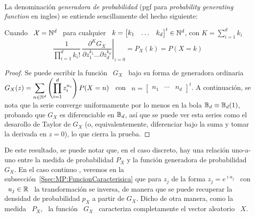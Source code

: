 \

La denominaci\'on  {\em generadora de  probabilidad} (pgf para  {\em probability
  generating function} en ingles) se entiende sencillamente del hecho siguiente:
%
\begin{lema}
  Cuando \ $\mathcal{X} = \mathbb{N}^d$ \ para cualquier \ $k = \begin{bmatrix} k_1 & \ldots &
    k_d \end{bmatrix}^t \in \mathbb{N}^d$, con $K = \sum_{i=1}^d k_i$
  \[
  \frac1{\prod_{i=1}^d  k_i!} \, \left.\frac{\partial^K  G_X}{\partial z_1^{k_1}
      \ldots \partial z_d^{k_d}}\right|_{z=0} = P_X(k) = P(X = k)
  \]
\end{lema}
%
\begin{proof}
  Se puede escribir la funci\'on \ $G_X$ \ bajo su forma de generadora ordinaria
  \ $\displaystyle G_X(z) =  \sum_{n \in \mathbb{N}^d} \left( \prod_{i=1}^d z_i^{n_i}
  \right)  P(X   =  n)$  \   con  \  $n   =  \begin{bmatrix}  n_1  &   \cdots  &
    n_d  \end{bmatrix}^t$.  A  continuaci\'on,  se nota  que  la serie  converge
  uniformamente por  lo menos en  la bola $\mathbb{B}_d \equiv  \mathbb{B}_d(1)$, probando
  que $G_X$  es diferenciable en $\mathbb{B}_d$,  as\'i que se puede  ver esta series
  como el desarollo de Taylor de $G_X$ (o, equivalentemente, diferenciar bajo la
  suma y tomar la derivada en $z = 0$), lo que cierra la prueba.
\end{proof}

De este resultado,  se puede notar que, en el caso  discreto, hay una relaci\'on
uno-a-uno entre  la medida  de probabilidad $P_X$  y la funci\'on  generadora de
probabilidad $G_X$.  En el caso continuo  ,  veremos en la
subsecci\'on~\ref{Ssec:MP:FuncionCaracterisica} que para  $z_j$ de la forma $z_j
= e^{\imath u_j}$ \  con \ $u_j \in \mathbb{R}$ \ la  transformaci\'on se inversa, de
manera que se  puede recuperar la densidad de  probabilidad $p_X$  a partir de $G_X$. Dicho de otra manera, como la medida \
$P_X$, \ la funci\'on \ $G_X$  \ caracteriza completamente el vector aleatorio \
$X$.

\

